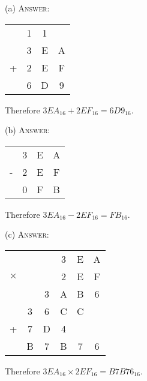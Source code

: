 
(a)
\textsc{Answer:}\vspace{-2mm}
\begin{answerlong}
\begin{longtable}{cccc}
  & 1 & 1      \\
  & 3 & E & A  \\ 
+ & 2 & E & F  \\ \hline
  & 6 & D & 9  \\ \hline
\end{longtable}
Therefore $3EA_{16} + 2EF_{16} = 6D9_{16}$.
\end{answerlong}
  
(b)
\textsc{Answer:}\vspace{-2mm}
\begin{answerlong}
\begin{longtable}{cccc}
  & 3 & E & A  \\ 
- & 2 & E & F  \\ \hline
  & 0 & F & B  \\ \hline
\end{longtable}
Therefore $3EA_{16} - 2EF_{16} = FB_{16}$.
\end{answerlong}

(c)
\textsc{Answer:}\vspace{-2mm}
\begin{answerlong}
\begin{longtable}{cccccc}
          &   &   & 3 & E & A  \\ 
$\times$  &   &   & 2 & E & F  \\ \hline
          &   & 3 & A & B & 6  \\
          & 3 & 6 & C & C &    \\ 
+         & 7 & D & 4 &   &   \\ \hline
          & B & 7 & B & 7 & 6 \\ \hline
          
\end{longtable}
Therefore $3EA_{16} \times 2EF_{16} = B7B76_{16}$.
\end{answerlong}
